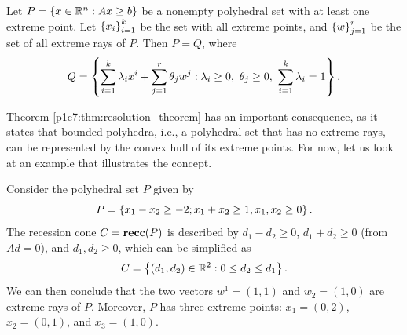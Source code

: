 \begin{theorem}\label{p1c7:thm:resolution_theorem}
	Let $P = \left\{ x \in \mathbb{R}^n : Ax \geq b \right \}$ be a nonempty polyhedral set with at least one extreme point. Let $\left\{ x_i \right \}_{i=1}^k$ be the set with all extreme points, and $\left\{ w \right \}_{j=1}^r$ be the set of all extreme rays of $P$. Then $P = Q$, where 
	\begin{equation*}
		Q = \braces{\sum_{i=1}^k \lambda_i x^i + \sum_{j=1}^r \theta_jw^j : \lambda_i \geq 0, \ \theta_j \geq 0, \ \sum_{i=1}^k \lambda_i =1}.
	\end{equation*}
\end{theorem}


Theorem \ref{p1c7:thm:resolution_theorem} has an important consequence, as it states that bounded polyhedra, i.e., a polyhedral set that has no extreme rays, can be represented by the convex hull of its extreme points. For now, let us look at an example that illustrates the concept.

Consider the polyhedral set $P$ given by
%
\begin{equation*}
	P = \left\{ x_1 - x_2 \geq -2; x_1 + x_2 \geq 1, x_1,x_2 \geq 0 \right \}.
\end{equation*}
%
The recession cone $C = {\bf recc}(P)$ is described by $d_1 - d_2 \geq 0$, $d_1 + d_2 \geq 0$ (from $Ad =0$), and $d_1, d_2 \geq 0$, which can be simplified as 
%
\begin{equation*}
	C = \left\{ (d_1, d_2) \in \mathbb{R}^2 : 0 \leq d_2 \leq d_1 \right \}.
\end{equation*}
%
We can then conclude that the two vectors $w^1 = (1,1)$ and $w_2 = (1,0)$ are extreme rays of $P$. Moreover, $P$ has three extreme points: $x_1 = (0,2)$, $x_2 = (0,1)$, and $x_3 = (1,0)$.

